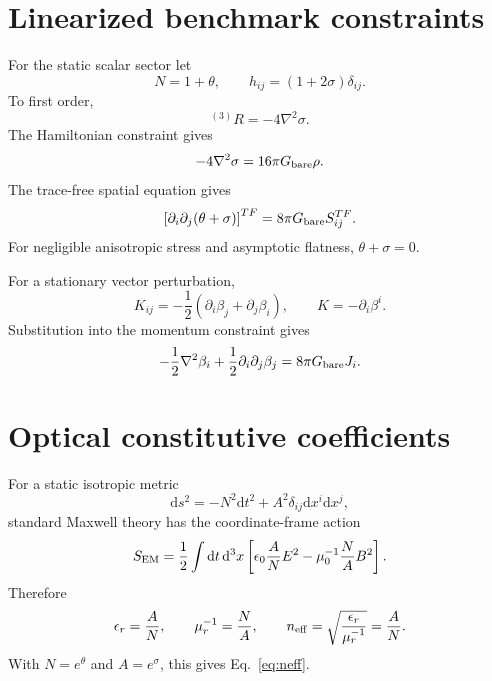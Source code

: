 \documentclass[11pt]{article}
\newcommand{\Gb}{G_{\rm bare}}
\newcommand{\dd}{\mathrm{d}}
\newcommand{\Rthree}{{}^{(3)}R}
\begin{document}
\appendix

\section{Linearized benchmark constraints}

For the static scalar sector let
\begin{equation}
N=1+\theta,\qquad h_{ij}=(1+2\sigma)\delta_{ij}.
\end{equation}
To first order,
\begin{equation}
\Rthree=-4\nabla^2\sigma.
\end{equation}
The Hamiltonian constraint gives
\begin{equation}
-4\nabla^2\sigma=16\pi\Gb\rho.
\end{equation}
The trace-free spatial equation gives
\begin{equation}
\left[\partial_i\partial_j(\theta+\sigma)\right]^{TF}=8\pi\Gb S_{ij}^{TF}.
\end{equation}
For negligible anisotropic stress and asymptotic flatness, $\theta+\sigma=0$.

For a stationary vector perturbation,
\begin{equation}
K_{ij}=-\frac12(\partial_i\beta_j+\partial_j\beta_i),
\qquad K=-\partial_i\beta^i.
\end{equation}
Substitution into the momentum constraint gives
\begin{equation}
-\frac12\nabla^2\beta_i+\frac12\partial_i\partial_j\beta_j=8\pi\Gb J_i.
\end{equation}

\section{Optical constitutive coefficients}

For a static isotropic metric
\begin{equation}
\dd s^2=-N^2\dd t^2+A^2\delta_{ij}\dd x^i\dd x^j,
\end{equation}
standard Maxwell theory has the coordinate-frame action
\begin{equation}
S_{\rm EM}=\frac12\int \dd t\,\dd^3x
\left[\epsilon_0\frac{A}{N}E^2-\mu_0^{-1}\frac{N}{A}B^2\right].
\end{equation}
Therefore
\begin{equation}
\epsilon_r=\frac{A}{N},\qquad \mu_r^{-1}=\frac{N}{A},
\qquad n_{\rm eff}=\sqrt{\frac{\epsilon_r}{\mu_r^{-1}}}=\frac{A}{N}.
\end{equation}
With $N=e^\theta$ and $A=e^\sigma$, this gives Eq.~\eqref{eq:neff}.
\end{document}

